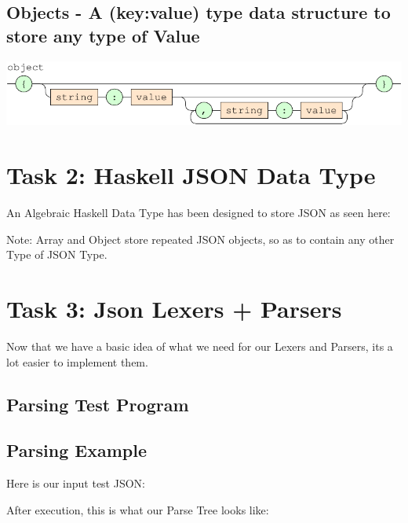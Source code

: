 \documentclass[a4paper]{article}
\begin{document}
\subsection*{Objects - A (key:value) type data structure to store any type of Value }

{\centering

   \includegraphics[scale=0.9]{EBNF/object}

}

\newpage


\section{Task 2: Haskell JSON Data Type}

An Algebraic Haskell Data Type has been designed to store JSON as seen here:

Note: Array and Object store repeated JSON objects, so as to contain any other Type of JSON Type.


\newpage

\section{Task 3: Json Lexers + Parsers}

Now that we have a basic idea of what we need for our Lexers and Parsers, its a lot
easier to implement them.



\subsection*{Parsing Test Program}



\newpage

\subsection*{Parsing Example}

Here is our input test JSON:


\noindent After execution, this is what our Parse Tree looks like:

\end{document}

